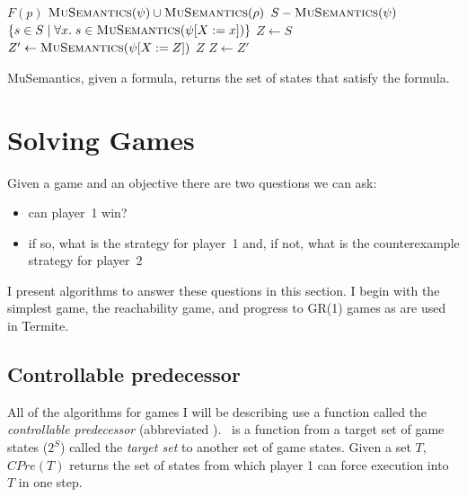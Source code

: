 \begin{algorithm}
\begin{algorithmic}

        \State\Return $F(p)$
    \ElsIf {$\phi = \psi \vee \rho$}
        \State\Return $\Call{MuSemantics}{\psi} \cup \Call{MuSemantics}{\rho}$
    \ElsIf {$\phi = \neg \psi$}
        \State\Return $S - \Call{MuSemantics}{\psi}$
    \State\Return $\{ s \in S \; | \; \forall x. \; s \in \Call{MuSemantics}{\psi[X:=x]} \}$
        \State $Z \gets S$
        \Loop
            \State $Z' \gets \Call{MuSemantics}{\psi[X:=Z]}$
                \State\Return $Z$
            \EndIf
            \State $Z \gets Z'$
        \EndLoop
    \EndIf
\EndFunction

\end{algorithmic}
\caption{MuSemantics, given a \mucalc formula, returns the set of states that satisfy the formula.}
\label{a:mu_semantics}
\end{algorithm}

\section{Solving Games}
\label{sec:intro_solving}

Given a game and an objective there are two questions we can ask:
\begin{itemize}
    \item can player~1 win?
    \item if so, what is the strategy for player~1 and, if not, what is the counterexample strategy for player~2
\end{itemize}

I present algorithms to answer these questions in this section. I begin with the simplest game, the reachability game, and progress to GR(1) games as are used in Termite.

\subsection{Controllable predecessor}

All of the algorithms for games I will be describing use a function called the \emph{controllable predecessor} (abbreviated \cpre). \cpre\ is a function from a target set of game states ($2^S$) called the \emph{target set} to another set of game states. Given a set $T$, $CPre(T)$ returns the set of states from which player 1 can force execution into $T$ in one step. 


